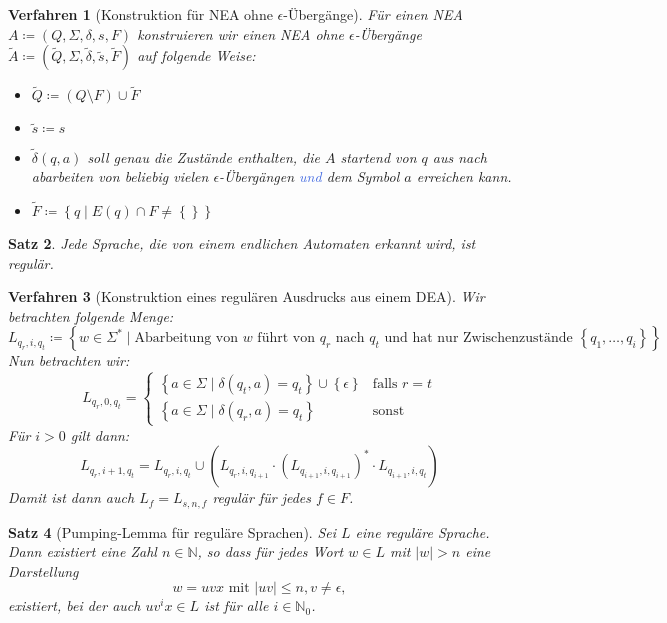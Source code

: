 \documentclass[11pt]{article}
\newcommand{\tcol}[1]{\textcolor{RoyalBlue}{#1}}
\newcommand{\set}[1]{\left\lbrace #1\right\rbrace}
\theoremstyle{break}
\newtheorem{satz}{Satz}[section]
\newtheorem{verf}[satz]{Verfahren}
\begin{document}
\begin{verf}[Konstruktion für NEA ohne $\epsilon$-Übergänge]
Für einen NEA $A\coloneqq (Q,\Sigma ,\delta ,s,F)$ konstruieren wir einen NEA ohne $\epsilon$-Übergänge $\tilde{A}\coloneqq (\tilde{Q},\Sigma ,\tilde{\delta},\tilde{s},\tilde{F})$ auf folgende Weise:
\begin{itemize}
\item $\tilde{Q}\coloneqq (Q\setminus F)\cup\tilde{F}$
\item $\tilde{s}\coloneqq s$
\item $\tilde{\delta}(q,a)$ soll genau die Zustände enthalten, die $A$ startend von $q$ aus nach abarbeiten von beliebig vielen $\epsilon$-Übergängen \tcol{und} dem Symbol $a$ erreichen kann.
\item $\tilde{F}\coloneqq\set{q\mid E(q)\cap F\neq\set{}}$
\end{itemize}
\end{verf}

\begin{satz}
Jede Sprache, die von einem endlichen Automaten erkannt wird, ist regulär.
\end{satz}

\begin{verf}[Konstruktion eines regulären Ausdrucks aus einem DEA]
Wir betrachten folgende Menge:
\[L_{q_r,i,q_t}\coloneqq\set{w\in\Sigma^*\mid\text{Abarbeitung von }w\text{ führt von }q_r\text{ nach }q_t\text{ und hat nur Zwischenzustände }\set{q_1,\dots ,q_i}}\]
Nun betrachten wir:
\[L_{q_r,0,q_t}=
	\begin{cases}
		\set{a\in\Sigma\mid\delta (q_t,a)=q_t}\cup\set{\epsilon} & \text{falls } r=t\\
		\set{a\in\Sigma\mid\delta (q_r,a)=q_t} & \text{sonst}
	\end{cases}\]
Für $i>0$ gilt dann:
\[L_{q_r,i+1,q_t}=L_{q_r,i,q_t}\cup (L_{q_r,i,q_{i+1}}\cdot (L_{q_{i+1},i,q_{i+1}})^*\cdot L_{q_{i+1},i,q_t})\]
Damit ist dann auch $L_f=L_{s,n,f}$ regulär für jedes $f\in F$.
\end{verf}

\begin{satz}[Pumping-Lemma für reguläre Sprachen]
Sei $L$ eine reguläre Sprache. Dann existiert eine Zahl $n\in\mathbb{N}$, so dass für jedes Wort $w\in L$ mit $|w|>n$ eine Darstellung
\[w=uvx \text{ mit } |uv|\leq n, v\neq\epsilon,\]
existiert, bei der auch $uv^ix\in L$ ist für alle $i\in\mathbb{N}_0$.
\end{satz}
\end{document}
